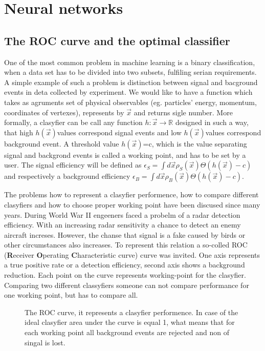 \newcommand{\h}{$h(\vec x)$}
\newcommand{\e}{\epsilon}
\chapter{Neural networks}\label{chapter:NN}



\section{The ROC curve and the optimal classifier}
One of the most common problem in machine learning is a binary classification, when a data set has to be divided into two subsets, fulfiling serian requirements. A simple example of such a problem is distinction between signal and bacground events in deta collected by experiment. We would like to have a function which takes as agruments set of physical observables (eg. particles' energy, momentum, coordinates of vertexes), represents by $\vec{x}$ and returns sigle number. More formally, a clasyfier can be call any function $h: \vec x \rightarrow \mathbb{R}$ designed in such a way, that high \h values correspond signal events and low \h values correspond background event. A threshold value  \h =c, which is the value separating signal and backgrond events is called a working point, and has to be set by a user. The signal efficiency will be defined as $\e_S=\int d\vec x \rho_S(\vec x) \Theta(h(\vec x) -c)$ and respectively a background efficiency $\e_B=\int d\vec x \rho_B(\vec x) \Theta(h(\vec x) -c)$.

The problems how to represent a clasyfier performence, how to compare different clasyfiers and how to choose proper working point have been discused since many years. During World War II engeeners faced a probelm of a radar detection efficiency. With an increasing radar sensitivity a chance to detect an enemy aircraft increses. However, the chanse that signal is a fake caused by birds or other circumstances also increases. To represent this relation a so-colled ROC (\textbf{R}eceiver \textbf{O}perating \textbf{C}haracteristic curve) curve was invited. One axis represents a true positive rate  or a detection efficiency, second axis shows a background reduction. Each point on the curve represents working-point for the clasyfier. Comparing two different classyfiers someone can not compare performance for one working point, but has to compare all.

\begin{figure}[hb]
  \centering
  \caption{The ROC curve, it represents a clasyfier performence. In case of the ideal clasyfier area under the curve is equal 1, what means that for each working point all background events are rejected and non of singal is lost. }
  \label{fig:eigh}
\end{figure}


